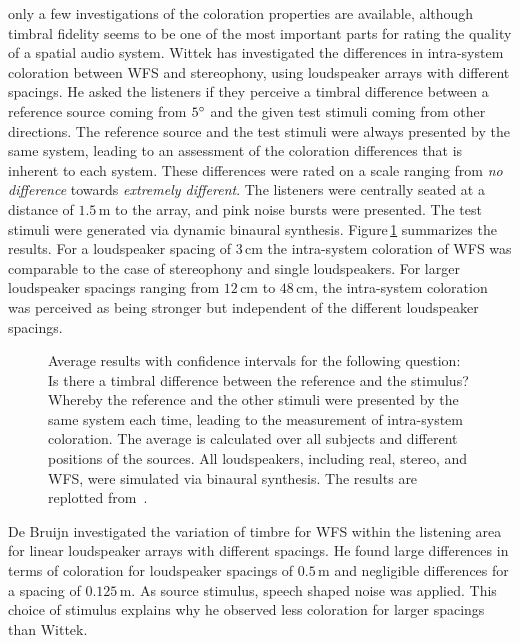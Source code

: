  only a few investigations of the coloration properties
are available, although timbral fidelity seems to be one of the most important
parts for rating the quality of a spatial audio system.\autocite{Rumsey2005}
Wittek\autocite{Wittek2007} has investigated the differences in intra-system
coloration between \ac{WFS} and stereophony, using loudspeaker arrays with different spacings.
He asked the listeners if they perceive a timbral
difference between a reference source coming from $5^\circ$ and the given test
stimuli coming from other directions. The reference source and the test stimuli
were always presented by the same system, leading to an assessment of the
coloration differences that is inherent to each system. These
differences were rated on a scale ranging from \emph{no difference}
towards \emph{extremely different}.
The listeners were centrally seated at a distance of
$1.5$\,m to the array, and pink noise bursts were presented.
The test stimuli were generated via dynamic binaural synthesis.
Figure\,\ref{fig:wfs_coloration_wittek} summarizes the results.
For a loudspeaker spacing of $3$\,cm the intra-system coloration of \ac{WFS}
was comparable to the case of stereophony and single loudspeakers. For
larger loudspeaker spacings ranging from $12$\,cm to $48$\,cm, the intra-system
coloration was perceived as being stronger but independent of the different
loudspeaker spacings.
%
\begin{figure}[t]
    \small
    \centering
    
    \caption{Average results with confidence intervals for the following question:
    Is there a timbral difference between the reference and the stimulus?
    Whereby the reference and the other stimuli were presented by the same
    system each time, leading to the measurement of intra-system coloration.
    The average is calculated over all subjects and different positions of the
    sources. All loudspeakers, including real, stereo, and WFS, were simulated
    via binaural synthesis. The results are replotted
    from~\cite[][Fig.\,8.6]{Wittek2007}.
    }
    \label{fig:wfs_coloration_wittek}
\end{figure}

De Bruijn\autocite{DeBrujin2004} investigated the variation of
timbre for \ac{WFS} within the listening area for linear loudspeaker arrays
with different spacings.
He found large differences in terms of coloration for loudspeaker spacings of $0.5$\,m
and negligible differences for a spacing of $0.125$\,m. As source stimulus, speech shaped
noise was applied. This choice of stimulus explains why he observed less
coloration for larger spacings than Wittek.

